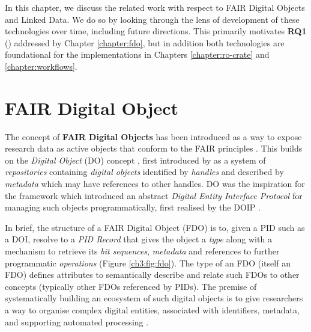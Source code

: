 \label{ch3:background}

In this chapter, we discuss the related work with respect to FAIR Digital Objects and Linked Data. We do so by looking through the lens of development of these technologies over time, including future directions. This primarily motivates \textbf{RQ1} () addressed by Chapter \ref{chapter:fdo}, but in addition both technologies are foundational for the implementations in Chapters \ref{chapter:ro-crate} and \ref{chapter:workflows}.


\section{FAIR Digital Object}\label{ch3:fdo}


The concept of \textbf{FAIR Digital Objects} \cite{Schultes 2019} has been introduced as a way to expose research data as active objects that conform to the FAIR principles \cite{Wilkinson 2016}. This builds on the \emph{Digital Object} (DO) concept \cite{Kahn 2006}, first introduced by \cite{Kahn 1995} as a system of \emph{repositories} containing \emph{digital objects} identified by \emph{handles} \cite{Sun 2003a} and described by \emph{metadata} which may have references to other handles. DO was the inspiration for the \cite{ITU-T X.1255} framework which introduced an abstract \emph{Digital Entity Interface Protocol} for managing such objects programmatically, first realised by the 
\acrfull{DOIP}
\cite{Reilly 2009}.

In brief, the structure of a FAIR Digital Object (FDO) is to, given a 
\acrfull{PID}
such as a \acrshort{DOI}, resolve to a \emph{PID Record} that gives the object a \emph{type} along with a mechanism to retrieve its \emph{bit sequences}, \emph{metadata} and references to further programmatic \emph{operations} (Figure \vref{ch3:fig:fdo}). The type of an FDO (itself an FDO) defines attributes to semantically describe and relate such FDOs to other concepts (typically other FDOs referenced by PIDs). The premise of systematically building an ecosystem of such digital objects is to give researchers a way to organise complex digital entities, associated with identifiers, metadata, and supporting automated processing \cite{Wittenburg 2019}.

